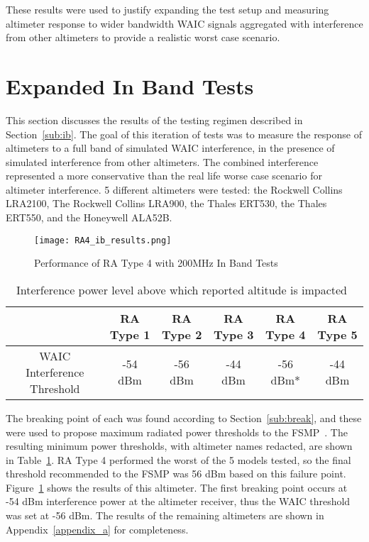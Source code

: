 These results were used to justify expanding the test setup and measuring altimeter response to wider bandwidth WAIC signals aggregated with interference from other altimeters to provide a realistic worst case scenario.

\section{Expanded In Band Tests}\label{sec:dvsg_ib_results}
This section discusses the results of the testing regimen described in Section~\ref{sub:ib}. The goal of this iteration of tests was to measure the response of altimeters to a full band of simulated WAIC interference, in the presence of simulated interference from other altimeters. The combined interference represented a more conservative than the real life worse case scenario for altimeter interference. 5 different altimeters were tested: the Rockwell Collins LRA2100, The Rockwell Collins LRA900, the Thales ERT530, the Thales ERT550, and the Honeywell ALA52B.
 \begin{figure}[h!]
	\centering
	\texttt{[image: RA4\_ib\_results.png]}
	\caption{Performance of RA Type 4 with 200MHz In Band Tests}
	\label{fig:RA4}
\end{figure}

\begin{table}[]
\begin{tabular}{@{}cccccc@{}}
\toprule
                            & RA Type 1 & RA Type 2 & RA Type 3 & RA Type 4 & RA Type 5 \\ \midrule
WAIC Interference Threshold & -54 dBm   & -56 dBm   & -44 dBm   & -56 dBm*  & -44 dBm   \\ \bottomrule
\end{tabular}
\caption{Interference power level above which reported altitude is impacted~\cite{uwe_radio_2019}}
\label{tab:ib_thresholds_fsmp}
\end{table}

 The breaking point of each was found according to Section~\ref{sub:break}, and these were used to propose maximum radiated power thresholds to the FSMP~\cite{uwe_radio_2019}. The resulting minimum power thresholds, with altimeter names redacted, are shown in Table~\ref{tab:ib_thresholds_fsmp}. RA Type 4 performed the worst of the 5 models tested, so the final threshold recommended to the FSMP was 56 dBm based on this failure point. Figure~\ref{fig:RA4} 
 shows the results of this altimeter. The first breaking point occurs at -54 dBm interference power at the altimeter receiver, thus the WAIC threshold was set at -56 dBm. The results of the remaining altimeters are shown in Appendix~\ref{appendix_a} for completeness. 

